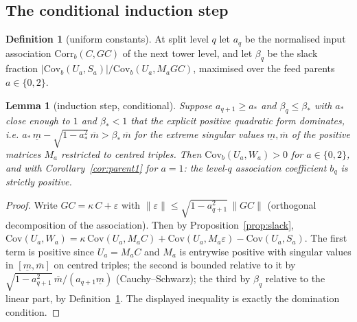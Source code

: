 \documentclass[11pt]{article}
\newtheorem{lemma}[theorem]{Lemma}
\theoremstyle{definition}
\newtheorem{definition}[theorem]{Definition}
\begin{document}
\subsection{The conditional induction step}

\begin{definition}[uniform constants]\label{def:constants}
At split level $q$ let $a_q$ be the normalised input association
$\mathrm{Corr}_b(C, GC)$ of the next tower level, and let $\beta_q$ be the
slack fraction $|\mathrm{Cov}_b(U_a, S_a)| / \mathrm{Cov}_b(U_a, M_a GC)$,
maximised over the feed parents $a \in \{0,2\}$.
\end{definition}

\begin{lemma}[induction step, conditional]\label{lem:induction}
Suppose $a_{q+1} \ge a_*$ and $\beta_q \le \beta_*$ with
$a_*$ close enough to $1$ and $\beta_* < 1$ that the explicit positive
quadratic form dominates, i.e.
$a_*\,\underline{m} - \sqrt{1-a_*^2}\,\overline{m} > \beta_*\,\overline{m}$
for the extreme singular values $\underline m, \overline m$ of the positive
matrices $M_a$ restricted to centred triples. Then
$\mathrm{Cov}_b(U_a, W_a) > 0$ for $a \in \{0, 2\}$, and with
Corollary~\ref{cor:parent1} for $a = 1$: the level-$q$ association
coefficient $b_q$ is strictly positive.
\end{lemma}

\begin{proof}
Write $GC = \kappa\,C + \varepsilon$ with
$\|\varepsilon\| \le \sqrt{1-a_{q+1}^2}\,\|GC\|$ (orthogonal decomposition of
the association). Then by Proposition~\ref{prop:slack},
$\mathrm{Cov}(U_a, W_a) = \kappa\,\mathrm{Cov}(U_a, M_a C)
+ \mathrm{Cov}(U_a, M_a \varepsilon) - \mathrm{Cov}(U_a, S_a)$.
The first term is positive since $U_a = M_a C$ and $M_a$ is entrywise
positive with singular values in $[\underline m, \overline m]$ on centred
triples; the second is bounded relative to it by
$\sqrt{1-a_{q+1}^2}\,\overline m / (a_{q+1} \underline m)$ (Cauchy--Schwarz);
the third by $\beta_q$ relative to the linear part, by
Definition~\ref{def:constants}. The displayed inequality is exactly the
domination condition.
\end{proof}
\end{document}
